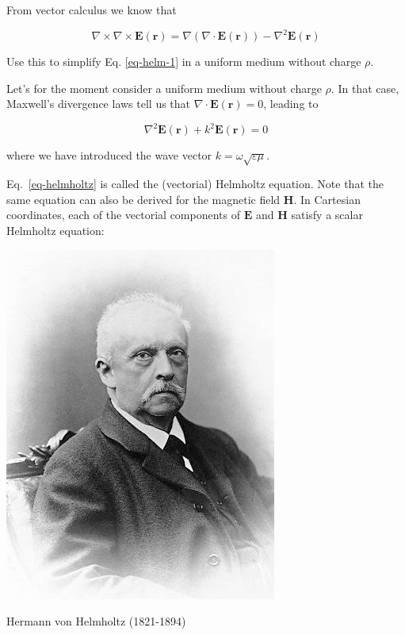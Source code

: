 From vector calculus we know that

\begin{equation}
\nabla \times \nabla \times {\mathbf E}({\mathbf r}) = \nabla (\nabla \cdot {\mathbf E}({\mathbf r})) - \nabla^2 {\mathbf E}({\mathbf r})
\end{equation}

\begin{cue}
Use this to simplify Eq. \ref{eq-helm-1} in a uniform medium without charge $\rho$. 
\end{cue}

Let's for the moment consider a uniform medium without charge $\rho$. In that case, Maxwell's divergence laws tell us that $\nabla \cdot {\mathbf E}({\mathbf r})=0$, leading to

\begin{equation}
\nabla^2 {\mathbf E}({\mathbf r}) + k^2 {\mathbf E}({\mathbf r}) = 0 \label{eq-helmholtz}
\end{equation}

where we have introduced the wave vector $k=\omega \sqrt{\varepsilon \mu}$.

Eq.~\ref{eq-helmholtz} is called the (vectorial) Helmholtz equation. Note that the same equation can also be derived for the magnetic field ${\mathbf H}$. In Cartesian coordinates, each of the vectorial components of ${\mathbf E}$ and ${\mathbf H}$ satisfy a scalar Helmholtz equation:

\begin{marginfigure}[-0.0cm]
  \includegraphics{helmholtz/figures/Hermann_von_Helmholtz}
  \caption{Hermann von Helmholtz (1821-1894)}
\end{marginfigure}

